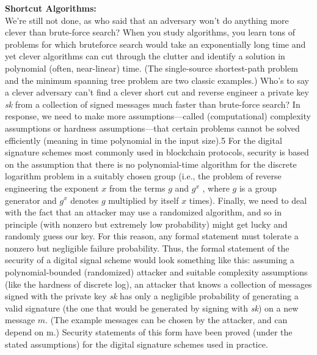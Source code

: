\vspace{0.3cm}
\noindent
\textbf{Shortcut Algorithms:} \\
We’re still not done, as who said that an adversary won’t do anything more clever than
brute-force search? When you study algorithms, you learn tons of problems for which bruteforce search would take an exponentially long time and yet clever algorithms can cut through
the clutter and identify a solution in polynomial (often, near-linear) time. (The single-source
shortest-path problem and the minimum spanning tree problem are two classic examples.)
Who’s to say a clever adversary can’t find a clever short cut and reverse engineer a private key
\textit{sk} from a collection of signed messages much faster than brute-force search? In response, we
need to make more assumptions—called (computational) complexity assumptions or hardness
assumptions—that certain problems cannot be solved efficiently (meaning in time polynomial
in the input size).5 For the digital signature schemes most commonly used in blockchain
protocols, security is based on the assumption that there is no polynomial-time algorithm
for the discrete logarithm problem in a suitably chosen group (i.e., the problem of reverse
engineering the exponent $x$ from the terms $g$ and $g^x$
, where $g$ is a group generator and $g^x$
denotes $g$ multiplied by itself $x$ times).
Finally, we need to deal with the fact that an attacker may use a randomized algorithm,
and so in principle (with nonzero but extremely low probability) might get lucky and randomly guess our key. For this reason, any formal statement must tolerate a nonzero but
negligible failure probability. Thus, the formal statement of the security of a digital signal
scheme would look something like this: assuming a polynomial-bounded (randomized) attacker and suitable complexity assumptions (like the hardness of discrete log), an attacker
that knows a collection of messages signed with the private key \textit{sk} has only a negligible probability of generating a valid signature (the one that would be generated by signing with \textit{sk})
on a new message $m$. (The example messages can be chosen by the attacker, and can depend
on m.) Security statements of this form have been proved (under the stated assumptions)
for the digital signature schemes used in practice.

